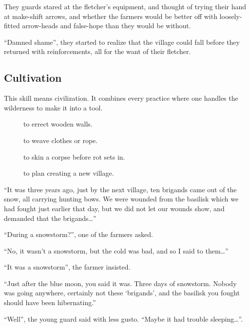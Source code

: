 \begin{multicols}{2}
\begin{exampletext}
  They \glspl{guard} stared at the fletcher's equipment, and thought of trying their hand at make-shift arrows, and whether the farmers would be better off with loosely-fitted arrow-heads and false-hope than they would be without.

  ``Damned shame'', they started to realize that the \gls{village} could fall before they returned with reinforcements, all for the want of their fletcher.
\end{exampletext}

\subsection{Cultivation}

This \gls{skill} means civilization.
It combines every practice where one handles the wilderness to make it into a tool.

\begin{description}
  \item[]
    to errect wooden walls.
  \item[]
    to weave clothes or rope.
  \item[]
    to skin a corpse before rot sets in.
  \item[]
    to plan creating a new \gls{village}.
\end{description}

\begin{exampletext}
  ``It was three years ago, just by the next \gls{village}, ten brigands came out of the snow, all carrying hunting bows.
  We were wounded from the \gls{basilisk} which we had fought just earlier that day, but we did not let our wounds show, and demanded that the brigands\ldots''

  ``During a snowstorm?'', one of the farmers asked.

  ``No, it wasn't a snowstorm, but the cold was bad, and so I said to them\ldots''

  ``It was a snowstorm'', the farmer insisted.

  ``Just after the blue moon, you said it was.
  Three days of snowstorm.
  Nobody was going anywhere, certainly not these `brigands', and the \gls{basilisk} you fought should have been hibernating.''

  ``Well'', the young \gls{guard} said with less gusto.
  ``Maybe it had trouble sleeping\ldots''.
\end{exampletext}


\end{multicols}

